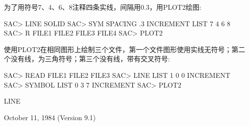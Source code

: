 为了用符号7、4、6、8注释四条实线，间隔用0.3，用PLOT2绘图:
\begin{SACCode}
SAC> LINE SOLID
SAC> SYM SPACING .3 INCREMENT LIST 7 4 6 8
SAC> R FILE1 FILE2 FILE3 FILE4
SAC> PLOT2
\end{SACCode}

使用PLOT2在相同图形上绘制三个文件，第一个文件图形使用实线无符号；第二个没有线，为三角符号；第三个没有线，带有交叉符号:
\begin{SACCode}
SAC> READ FILE1 FILE2 FILE3
SAC> LINE LIST 1 0 0 INCREMENT
SAC> SYMBOL LIST 0 3 7 INCREMENT
SAC> PLOT2
\end{SACCode}

LINE

October 11, 1984 (Version 9.1)
